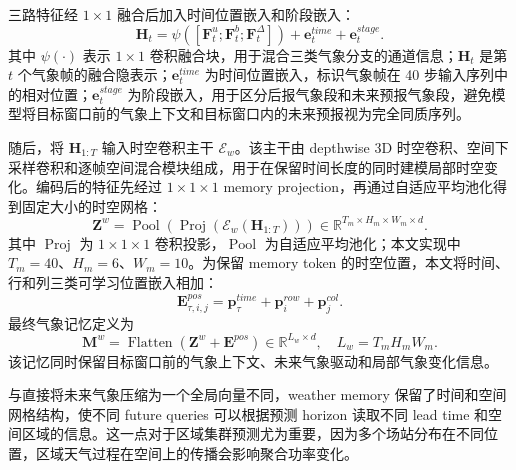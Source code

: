 三路特征经 \(1\times1\) 融合后加入时间位置嵌入和阶段嵌入：
\begin{equation}
\mathbf{H}_{t}=\psi([\mathbf{F}^{u}_{t};\mathbf{F}^{b}_{t};\mathbf{F}^{\Delta}_{t}])
+\mathbf{e}^{time}_{t}+\mathbf{e}^{stage}_{t}.
\end{equation}
其中 \(\psi(\cdot)\) 表示 \(1\times1\) 卷积融合块，用于混合三类气象分支的通道信息；\(\mathbf{H}_{t}\) 是第 \(t\) 个气象帧的融合隐表示；\(\mathbf{e}^{time}_{t}\) 为时间位置嵌入，标识气象帧在 40 步输入序列中的相对位置；\(\mathbf{e}^{stage}_{t}\) 为阶段嵌入，用于区分后报气象段和未来预报气象段，避免模型将目标窗口前的气象上下文和目标窗口内的未来预报视为完全同质序列。

随后，将 \(\mathbf{H}_{1:T}\) 输入时空卷积主干 \(\mathcal{E}_{w}\)。该主干由 depthwise 3D 时空卷积、空间下采样卷积和逐帧空间混合模块组成，用于在保留时间长度的同时建模局部时空变化。编码后的特征先经过 \(1\times1\times1\) memory projection，再通过自适应平均池化得到固定大小的时空网格：
\begin{equation}
\mathbf{Z}^{w}=
\operatorname{Pool}\left(\operatorname{Proj}(\mathcal{E}_{w}(\mathbf{H}_{1:T}))\right)
\in\mathbb{R}^{T_m\times H_m\times W_m\times d}.
\end{equation}
其中 \(\operatorname{Proj}\) 为 \(1\times1\times1\) 卷积投影，\(\operatorname{Pool}\) 为自适应平均池化；本文实现中 \(T_m=40\)、\(H_m=6\)、\(W_m=10\)。为保留 memory token 的时空位置，本文将时间、行和列三类可学习位置嵌入相加：
\begin{equation}
\mathbf{E}^{pos}_{\tau,i,j}=
\mathbf{p}^{time}_{\tau}+\mathbf{p}^{row}_{i}+\mathbf{p}^{col}_{j}.
\end{equation}
最终气象记忆定义为
\begin{equation}
\mathbf{M}^{w}=\operatorname{Flatten}(\mathbf{Z}^{w}+\mathbf{E}^{pos})
\in\mathbb{R}^{L_w\times d},\quad L_w=T_mH_mW_m.
\end{equation}
该记忆同时保留目标窗口前的气象上下文、未来气象驱动和局部气象变化信息。

与直接将未来气象压缩为一个全局向量不同，weather memory 保留了时间和空间网格结构，使不同 future queries 可以根据预测 horizon 读取不同 lead time 和空间区域的信息。这一点对于区域集群预测尤为重要，因为多个场站分布在不同位置，区域天气过程在空间上的传播会影响聚合功率变化。


